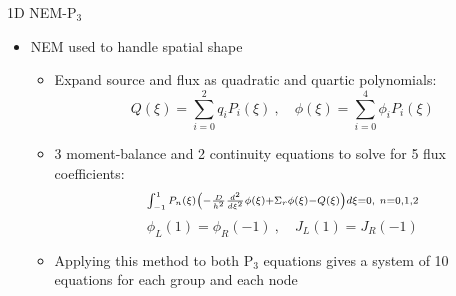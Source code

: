 
\begin{frame}[t]{1D NEM-P$_3$}

        \begin{itemize}
          \item NEM \cite{finnemann1977RodCuspingOrigMention} used to handle spatial shape
          \begin{itemize}
              \item Expand source and flux as quadratic and quartic polynomials:
                  \begin{equation*}\scriptstyle
                  Q\left(\xi\right) = \sum_{i=0}^2 q_i P_i\left(\xi\right)\ , \quad 
                  \phi\left(\xi\right) = \sum_{i=0}^4 \phi_i P_i\left(\xi\right)
                  \end{equation*}
              \item 3 moment-balance and 2 continuity equations to solve for 5 flux coefficients:
                  \begin{equation*}\scriptstyle
                  \intop_{-1}^1 P_n\left(\xi\right) 
                  \left(-\frac{D}{h^2}\frac{d^2}{d\xi^2}\phi\left(\xi\right) + \Sigma_r 
                  \phi\left(\xi\right) - Q\left(\xi\right)\right)d\xi = 0,\ n=0,1,2
                  \end{equation*}
                  \begin{equation*}\scriptstyle
                  \phi_L\left(1\right) = \phi_R\left(-1\right)\ , \quad 
                  J_L\left(1\right) = J_R\left(-1\right)
                  \end{equation*}
              \item Applying this method to both P$_3$ equations gives a system of 10 equations for each group and each node
          \end{itemize}
        \end{itemize}
    
\end{frame}


